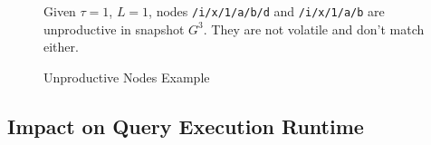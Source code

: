 \documentclass[abstracton,12pt]{scrartcl}
\theoremstyle{definition}
\begin{document}
\begin{figure}[h]
 

 

\vspace{3mm}
\caption*{
  Given $\tau = 1$, $L = 1$, nodes \texttt{/i/x/1/a/b/d} and \texttt{/i/x/1/a/b}
  are unproductive in snapshot $G^3$. They are not volatile and don't match either.
}
\caption{Unproductive Nodes Example}
\label{fig:unproductive_nodes}
\end{figure}

\subsection{Impact on Query Execution Runtime}
\end{document}
